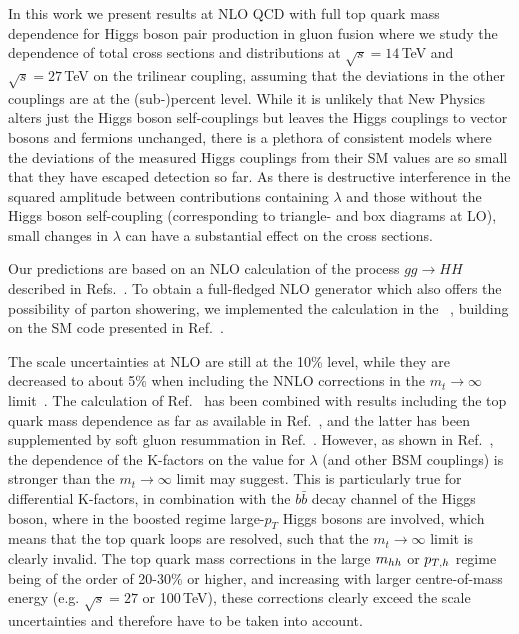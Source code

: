 \medskip

In this work we present results at NLO QCD with full top quark mass dependence for Higgs boson pair production in gluon fusion where we study the dependence of total cross sections and distributions at $\sqrt{s}=14$\,TeV and $\sqrt{s}=27$\,TeV on the trilinear coupling, assuming that the deviations in the other couplings are at the (sub-)percent level.
While it is unlikely that New Physics alters just the Higgs boson self-couplings but leaves the Higgs couplings to vector bosons and fermions unchanged, there is a plethora of consistent models where the deviations of the measured Higgs couplings from their SM values are so small that they have escaped detection so far. 
As there is destructive interference in the squared amplitude between contributions containing $\lambda$ and those without the Higgs boson self-coupling (corresponding to triangle- and box diagrams at LO), 
small changes in $\lambda$ can have a substantial effect on the cross sections.

Our predictions are based on an NLO calculation of the process $gg\to HH$ described in Refs.~\cite{Borowka:2016ehy,Borowka:2016ypz}. 
To obtain a full-fledged NLO generator which also offers the possibility of parton showering, we implemented the calculation in the 
\powhegbox~\cite{Nason:2004rx,Frixione:2007vw,Alioli:2010xd}, building on the SM code presented in Ref.~\cite{Heinrich:2017kxx}.

The scale uncertainties at NLO are still at the 10\% level, while they are decreased to about 5\% when including the NNLO corrections
in the $m_t\to\infty$ limit~\cite{deFlorian:2013jea,Grigo:2015dia,deFlorian:2016uhr}. The calculation of Ref.~\cite{deFlorian:2016uhr} has been combined with results including the top quark mass dependence as far as available in Ref.~\cite{Grazzini:2018bsd}, and the latter has been supplemented by soft gluon resummation in Ref.~\cite{deFlorian:2018tah}.
However, as shown in Ref.~\cite{Buchalla:2018yce}, the dependence of the K-factors on the value for $\lambda$ (and other BSM couplings) is stronger than the $m_t\to\infty$ limit may suggest. This is particularly true for differential K-factors, 
in combination with the $b\bar{b}$ decay channel of the Higgs boson, where in the boosted regime large-$p_T$ Higgs bosons are involved, which means that the top quark loops are resolved, such that the  $m_t\to\infty$ limit is clearly invalid.
The top quark mass corrections in the large $m_{hh}$ or $p_{T,h}$ regime being of the order of 20-30\% or higher, and increasing with larger centre-of-mass energy (e.g. $\sqrt{s}=27$ or 100\,TeV), these corrections clearly exceed the scale uncertainties and therefore have to be taken into account.

